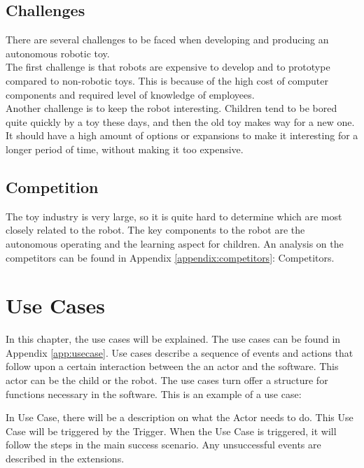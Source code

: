 \documentclass[11pt,twoside,a4paper]{report}
\begin{document}
\section{Challenges}
There are several challenges to be faced when developing and producing an autonomous robotic toy. \\
The first challenge is that robots are expensive to develop and to prototype compared to non-robotic toys. This is because of the high cost of computer components and required level of knowledge of employees.\\
Another challenge is to keep the robot interesting. Children tend to be bored quite quickly by a toy these days, and then the old toy makes way for a new one. It should have a high amount of options or expansions to make it interesting for a longer period of time, without making it too expensive. 
\section{Competition}
The toy industry is very large, so it is quite hard to determine which are most closely related to the robot. The key components to the robot are the autonomous operating and the learning aspect for children. An analysis on the competitors can be found in Appendix \ref{appendix:competitors}: Competitors.

\chapter{Use Cases}
In this chapter, the use cases will be explained. The use cases can be found in Appendix \ref{app:usecase}. 
Use cases describe a sequence of events and actions that follow upon a certain interaction between the an actor and the software. This actor can be the child or the robot. The use cases turn offer a structure for functions necessary in the software.
This is an example of a use case:

\begin{usecase}
\end{usecase}
In Use Case, there will be a description on what the Actor needs to do. This Use Case will be triggered by the Trigger. When the Use Case is triggered, it will follow the steps in the main success scenario. Any unsuccessful events are described in the extensions. 
\end{document}

